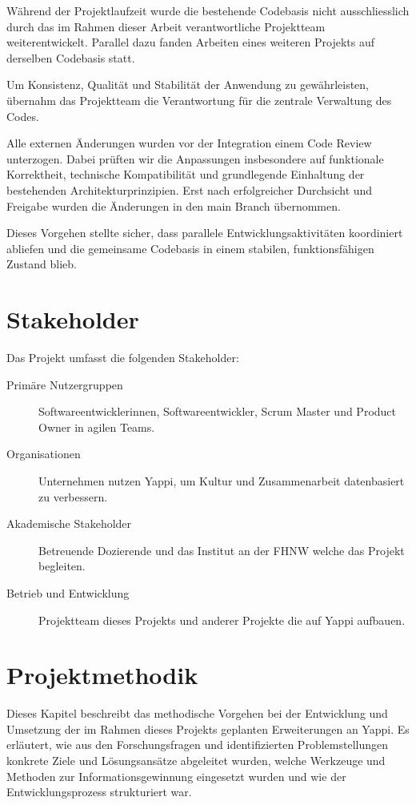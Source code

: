 \documentclass[12pt,a4paper]{report}
\begin{document}
Während der Projektlaufzeit wurde die bestehende Codebasis nicht ausschliesslich durch das im Rahmen dieser Arbeit verantwortliche
Projektteam weiterentwickelt. Parallel dazu fanden Arbeiten eines weiteren Projekts auf derselben Codebasis statt. 

Um Konsistenz, Qualität und Stabilität der Anwendung zu gewährleisten, übernahm das Projektteam die Verantwortung für die zentrale
Verwaltung des Codes.

Alle externen Änderungen wurden vor der Integration einem Code Review unterzogen. Dabei prüften wir die Anpassungen insbesondere
auf funktionale Korrektheit, technische Kompatibilität und grundlegende Einhaltung der bestehenden Architekturprinzipien. Erst
nach erfolgreicher Durchsicht und Freigabe wurden die Änderungen in den main Branch übernommen.

Dieses Vorgehen stellte sicher, dass parallele Entwicklungsaktivitäten koordiniert abliefen und die gemeinsame Codebasis in einem
stabilen, funktionsfähigen Zustand blieb.

\section{Stakeholder}

Das Projekt umfasst die folgenden Stakeholder:

\begin{description}
  \item[Primäre Nutzergruppen] Softwareentwicklerinnen, Softwareentwickler, Scrum Master und Product Owner in agilen Teams.
  \item[Organisationen] Unternehmen nutzen Yappi, um Kultur und Zusammenarbeit datenbasiert zu verbessern.
  \item[Akademische Stakeholder] Betreuende Dozierende und das Institut an der FHNW welche das Projekt begleiten.
  \item[Betrieb und Entwicklung] Projektteam dieses Projekts und anderer Projekte die auf Yappi aufbauen.
\end{description}

\section{Projektmethodik}

Dieses Kapitel beschreibt das methodische Vorgehen bei der Entwicklung und Umsetzung der im Rahmen dieses Projekts geplanten
Erweiterungen an Yappi. Es erläutert, wie aus den Forschungsfragen und identifizierten Problemstellungen konkrete Ziele und
Lösungsansätze abgeleitet wurden, welche Werkzeuge und Methoden zur Informationsgewinnung eingesetzt wurden und wie der
Entwicklungsprozess strukturiert war.
\end{document}
